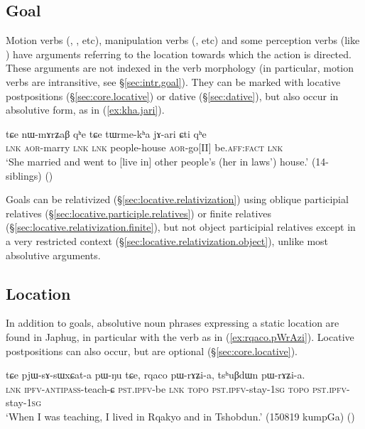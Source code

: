 \subsection{Goal} \label{absolutive.goal}  
Motion verbs (, ,  etc), manipulation verbs (,  etc) and some perception verbs (like ) have arguments referring to the location towards which the action is directed. These arguments are not indexed in the verb morphology (in particular, motion verbs are intransitive, see §\ref{sec:intr.goal}). They can be marked with locative postpositions (§\ref{sec:core.locative}) or dative (§\ref{sec:dative}), but also occur in absolutive form, as  in (\ref{ex:kha.jari}).

\begin{exe}
\ex \label{ex:kha.jari}
 \gll tɕe nɯ-mɤrʑaβ qʰe tɕe tɯrme-kʰa jɤ-ari ɕti qʰe  \\
 \textsc{lnk} \textsc{aor}-marry \textsc{lnk}  \textsc{lnk} people-house \textsc{aor}-go[II] be.\textsc{aff}:\textsc{fact} \textsc{lnk} \\
\glt `She married and went to [live in] other people's (her in laws') house.' (14-siblings) ()
\end{exe}

Goals can be relativized (§\ref{sec:locative.relativization}) using oblique participial relatives (§\ref{sec:locative.participle.relatives}) or finite relatives (§\ref{sec:locative.relativization.finite}), but not object participial relatives except in a very restricted context (§\ref{sec:locative.relativization.object}), unlike most absolutive arguments.

\subsection{Location} \label{absolutive.locative}
In addition to goals, absolutive noun phrases expressing a static location are found in Japhug, in particular with the verb  as in (\ref{ex:rqaco.pWrAzi}).  Locative postpositions can also occur, but are optional (§\ref{sec:core.locative}).

\begin{exe}
\ex \label{ex:rqaco.pWrAzi}
 \gll  tɕe pjɯ-sɤ-sɯxɕat-a pɯ-ŋu tɕe, rqaco pɯ-rɤʑi-a, tsʰuβdɯn pɯ-rɤʑi-a. \\
 \textsc{lnk} \textsc{ipfv}-\textsc{antipass}-teach-ɕ \textsc{pst}.\textsc{ipfv}-be \textsc{lnk}  \textsc{topo} \textsc{pst}.\textsc{ipfv}-stay-\textsc{1sg}  \textsc{topo} \textsc{pst}.\textsc{ipfv}-stay-\textsc{1sg}  \\
 \glt `When I was teaching, I lived in Rqakyo and in Tshobdun.' (150819 kumpGa) ()
\end{exe}

